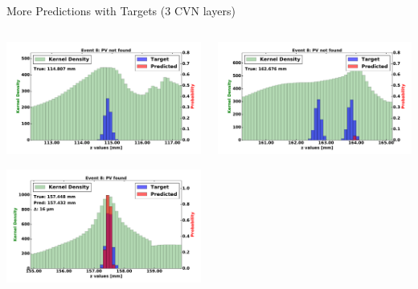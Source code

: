 \begin{frame}{More Predictions with Targets (3 CVN layers)}
  \begin{columns}[c]
        \begin{center}
            \includegraphics[width=1\textwidth,height=0.45\textwidth, trim=18 0 18 0]{images/120000_3layer_49.pdf}

            \includegraphics[width=1\textwidth, height=0.45\textwidth,trim=18 0 18 0]{images/120000_3layer_50.pdf}

        \end{center}
        \begin{center}
           \includegraphics[width=1\textwidth, height=0.45\textwidth, trim=18 0 18 0]{images/120000_3layer_51.pdf}


\end{center}
\end{columns}
\end{frame}
